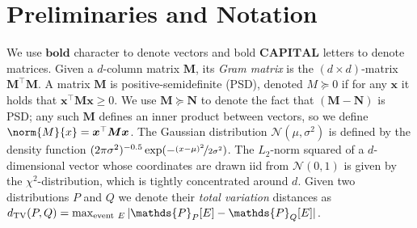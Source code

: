 \documentclass{article}
\renewcommand{\vec}[1]{\bm{#1}}
\renewcommand{\Pr}{\mathds{P}}
\providecommand\transp{\top}
\let\transpsymbol\transp
\renewcommand{\transp}[1]{#1^\transpsymbol}
\newcommand{\Normal}{\mathcal{N}}
\begin{document}
\section{Preliminaries and Notation}
\label{sec:preliminaries}

We use $\vec{bold}$ character to denote vectors and bold
$\vec{CAPITAL}$ letters to denote matrices.
Given a $d$-column matrix
$\vec M$, its \emph{Gram matrix} is the $(d\times d)$-matrix
$\transp{\vec M}\vec M$.  A matrix $\vec M$ is positive-semidefinite
(PSD), denoted $M\succeq 0$ if for any $\vec x$ it holds that
$\transp{\vec x} \vec M \vec x \geq 0$.  We use $\vec M\succeq \vec N$
to denote the fact that $(\vec M-\vec N)$ is PSD; any such $\vec M$
defines an inner product between vectors, so we define
$\norm{M}{x} = \transp{\vec x} \vec M \vec x$.  The
Gaussian distribution $\Normal(\mu,\sigma^2)$ is defined by the density
function
$(2\pi\sigma^2)^{-0.5}\exp(-\nicefrac{(x-\mu)^2}{2\sigma^2})$. The
$L_2$-norm squared of a $d$-dimensional vector whose coordinates are
drawn iid from $\Normal(0,1)$ is given by the $\chi^2$-distribution,
which is tightly concentrated around $d$. Given two distributions $P$
and $Q$ we denote their \emph{total variation} distances as
$d_{\rm TV}(P,Q) = \max_{{\rm
    event}~E}|\Pr_P[E]-\Pr_Q[E]|$.  %
\end{document}
